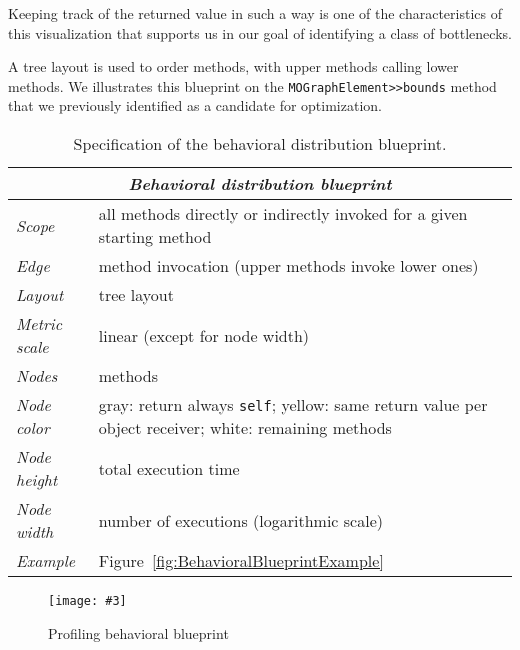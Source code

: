 \documentclass[runningheads]{llncs}
\newcommand{\ct}{\lstinline[backgroundcolor=\color{white},basicstyle=\footnotesize\ttfamily]}
\newcommand{\fig}[4]{
	\begin{figure}[#1]
		\centering
		\texttt{[image: \#3]}
		\caption{\label{fig:#3}#4}
	\end{figure}}
\newcommand{\figref}[1]{Figure~\ref{fig:#1}}
\newcommand{\tablabel}[1]{\label{tab:#1}}
\begin{document}
Keeping track of the returned value in such a way is one of the characteristics of this visualization that supports us in our goal of identifying a class of bottlenecks.

A tree layout is used to order methods, with upper methods calling lower methods. We illustrates this blueprint on the \ct{MOGraphElement>>bounds} method that we previously identified as a candidate for optimization.\\

\begin{table}
\begin{center}
\begin{tabular}{|l|p{6cm}|}\hline
\multicolumn{2}{|c|}{\emph{\textbf{Behavioral distribution blueprint}}}\\\hline\hline

\emph{Scope}		& all methods directly or indirectly invoked for a given starting method\\\hline 
\hline
\emph{Edge}		& method invocation (upper methods invoke lower ones)\\ 
\emph{Layout}		& tree layout\\ 
\emph{Metric scale}	& linear (except for node width)\\
\emph{Nodes}		& methods\\ \hline
\hline
\emph{Node color}	& gray: return always \texttt{self}; yellow: same return value per object receiver; white: remaining methods\\ %
\emph{Node height}	& total execution time \\
\emph{Node width}	& number of executions (logarithmic scale)\\\hline 
\hline
\emph{Example} 	   & \figref{BehavioralBlueprintExample}\\\hline

\end{tabular}
\end{center}
\caption{Specification of the behavioral distribution blueprint.} \tablabel{behavioralBlueprint}
\end{table}

\fig{}{1.0}{ProfilingBlueprintEvolution}{Profiling behavioral blueprint}

\end{document}
